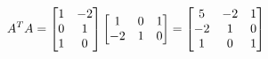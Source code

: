 \documentclass[preview]{standalone}
\begin{document}
\begin{align*}
\special{dvisvgm:raw <g id='unique000'>}A^T A = \begin{bmatrix} 1 & -2 \\ 0 & 1 \\ 1 & 0 \end{bmatrix} \begin{bmatrix} 1 & 0 & 1 \\ -2 & 1 & 0 \end{bmatrix} = \begin{bmatrix} 5 & -2 & 1 \\ -2 & 1 & 0 \\ 1 & 0 & 1 \end{bmatrix}\special{dvisvgm:raw </g>}
\end{align*}
\end{document}
